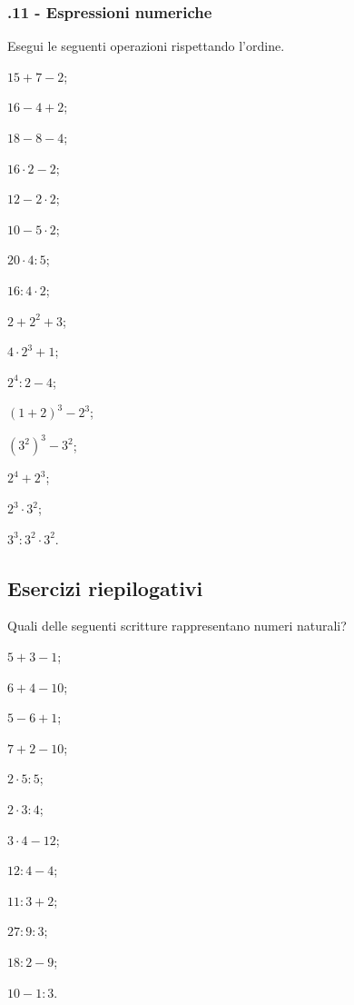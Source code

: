 \subsubsection*{\thechapter.11 - Espressioni numeriche}

\begin{esercizio}[\Ast]
\label{ese:1.27}
Esegui le seguenti operazioni rispettando l'ordine.
 \begin{multicols}{4}
 \begin{enumeratea}
 \item $15+7-2$;
 \item $16-4+2$;
 \item $18-8-4$;
 \item $16\cdot 2-2$;
 \item $12-2\cdot 2$;
 \item $10-5\cdot 2$;
 \item $20\cdot 4:5$;
 \item $16:4\cdot 2$;
 \item $2+2^2+3$;
 \item $4\cdot 2^3+1$;
 \item $2^4:2-4$;
 \item $(1+2)^3-2^3$;
 \item $\left(3^2\right)^3-3^2$;
 \item $2^4+2^3$;
 \item $2^3\cdot 3^2$;
 \item $3^3:3^2\cdot 3^2$.
 \end{enumeratea}
 \end{multicols}
\end{esercizio}

\subsection{Esercizi riepilogativi}
\begin{esercizio}[\Ast]
Quali delle seguenti scritture rappresentano numeri naturali?
 \begin{multicols}{4}
 \begin{enumeratea}
 \item $5+3-1$;
 \item $6+4-10$;
 \item $5-6+1$;
 \item $7+2-10$;
 \item $2\cdot 5:5$;
 \item $2\cdot 3:4$;
 \item $3\cdot 4-12$;
 \item $12:4-4$;
 \item $11:3+2$;
 \item $27:9:3$;
 \item $18:2-9$;
 \item $10-1:3$.
 \end{enumeratea}
 \end{multicols}
\end{esercizio}


